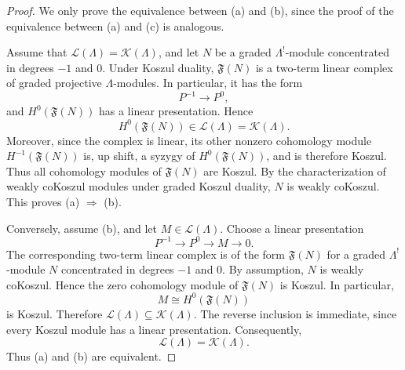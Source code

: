 \documentclass[11pt]{article}
\theoremstyle{definition}
\theoremstyle{remark}
\begin{document}
\begin{proof}
We only prove the equivalence between \textup{(a)} and \textup{(b)}, since the proof of the equivalence between \textup{(a)} and \textup{(c)} is analogous.

Assume that
\(\mathcal{L}(\Lambda)=\mathcal{K}(\Lambda)\), and let \(N\) be a graded
\(\Lambda^{!}\)-module concentrated in degrees \(-1\) and \(0\). Under
Koszul duality, \(\mathfrak{F}(N)\) is a two-term linear complex of graded
projective \(\Lambda\)-modules. In particular, it has the form
\[
P^{-1}\longrightarrow P^{0},
\]
and \(H^{0}(\mathfrak{F}(N))\) has a linear presentation. Hence
\[
H^{0}(\mathfrak{F}(N))\in\mathcal{L}(\Lambda)
=\mathcal{K}(\Lambda).
\]
Moreover, since the complex is linear, its other nonzero cohomology module
\(H^{-1}(\mathfrak{F}(N))\) is, up shift, a
syzygy of \(H^{0}(\mathfrak{F}(N))\), and is therefore Koszul. Thus all
cohomology modules of \(\mathfrak{F}(N)\) are Koszul. By the
characterization of weakly coKoszul modules under graded Koszul duality,
\(N\) is weakly coKoszul. This proves \textup{(a)} \(\Rightarrow\)
\textup{(b)}.

Conversely, assume \textup{(b)}, and let
\(M\in\mathcal{L}(\Lambda)\). Choose a linear presentation
\[
P^{-1}\longrightarrow P^{0}\longrightarrow M\longrightarrow0.
\]
The corresponding two-term linear complex is of the form
\(\mathfrak{F}(N)\) for a graded \(\Lambda^{!}\)-module \(N\) concentrated
in degrees \(-1\) and \(0\). By assumption, \(N\) is weakly coKoszul.
Hence the zero cohomology module of \(\mathfrak{F}(N)\) is Koszul. In
particular,
\[
M\cong H^{0}(\mathfrak{F}(N))
\]
is Koszul. Therefore
\(\mathcal{L}(\Lambda)\subseteq\mathcal{K}(\Lambda)\). The reverse
inclusion is immediate, since every Koszul module has a linear
presentation. Consequently,
\[
\mathcal{L}(\Lambda)=\mathcal{K}(\Lambda).
\]
Thus \textup{(a)} and \textup{(b)} are equivalent.
\end{proof}
\end{document}
